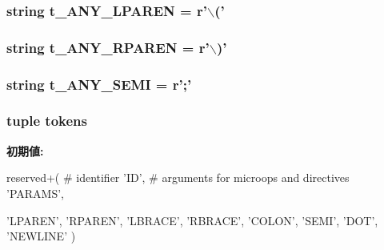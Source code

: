 \label{namespacemicro__asm_a65d7419bbffa21f7c4406f5518092c9b}
\hypertarget{namespacemicro__asm_adddd3644d1c96a6ff6c697f82c5c6fe9}{
\subsubsection[{t\_\-ANY\_\-LPAREN}]{\setlength{\rightskip}{0pt plus 5cm}string {\bf t\_\-ANY\_\-LPAREN} = r'$\backslash$('}}
\label{namespacemicro__asm_adddd3644d1c96a6ff6c697f82c5c6fe9}
\hypertarget{namespacemicro__asm_a48eea5b8a8376860f8538dafed3cc105}{
\subsubsection[{t\_\-ANY\_\-RPAREN}]{\setlength{\rightskip}{0pt plus 5cm}string {\bf t\_\-ANY\_\-RPAREN} = r'$\backslash$)'}}
\label{namespacemicro__asm_a48eea5b8a8376860f8538dafed3cc105}
\hypertarget{namespacemicro__asm_a5a4b0779a63cf66d21e5a48374083ab4}{
\subsubsection[{t\_\-ANY\_\-SEMI}]{\setlength{\rightskip}{0pt plus 5cm}string {\bf t\_\-ANY\_\-SEMI} = r';'}}
\label{namespacemicro__asm_a5a4b0779a63cf66d21e5a48374083ab4}
\hypertarget{namespacemicro__asm_a8949ccb05d719d97020ab994d6044eef}{
\subsubsection[{tokens}]{\setlength{\rightskip}{0pt plus 5cm}tuple {\bf tokens}}}
\label{namespacemicro__asm_a8949ccb05d719d97020ab994d6044eef}
{\bfseries 初期値:}
\begin{DoxyCode}
reserved+(
        # identifier
        'ID',
        # arguments for microops and directives
        'PARAMS',

        'LPAREN', 'RPAREN',
        'LBRACE', 'RBRACE',
        'COLON', 'SEMI', 'DOT',
        'NEWLINE'
        )
\end{DoxyCode}
